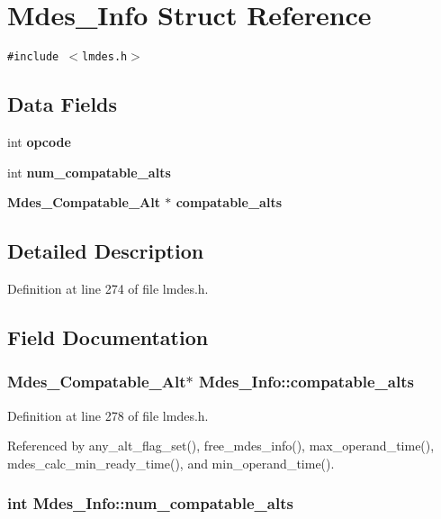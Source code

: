 \section{Mdes\_\-Info Struct Reference}
\label{structMdes__Info}
{\tt \#include $<$lmdes.h$>$}

\subsection*{Data Fields}
\begin{CompactItemize}
\item 
int \bf{opcode}
\item 
int \bf{num\_\-compatable\_\-alts}
\item 
\bf{Mdes\_\-Compatable\_\-Alt} $\ast$ \bf{compatable\_\-alts}
\end{CompactItemize}


\subsection{Detailed Description}




Definition at line 274 of file lmdes.h.

\subsection{Field Documentation}
\subsubsection{\setlength{\rightskip}{0pt plus 5cm}\bf{Mdes\_\-Compatable\_\-Alt}$\ast$ \bf{Mdes\_\-Info::compatable\_\-alts}}\label{structMdes__Info_ef1a9e5889654c6ee70e25f28c8c8f33}




Definition at line 278 of file lmdes.h.

Referenced by any\_\-alt\_\-flag\_\-set(), free\_\-mdes\_\-info(), max\_\-operand\_\-time(), mdes\_\-calc\_\-min\_\-ready\_\-time(), and min\_\-operand\_\-time().
\subsubsection{\setlength{\rightskip}{0pt plus 5cm}int \bf{Mdes\_\-Info::num\_\-compatable\_\-alts}}\label{structMdes__Info_2d46091833cf2d0c810328217a9cd6da}




